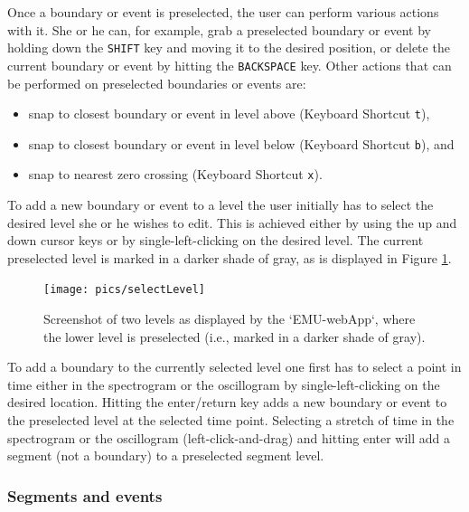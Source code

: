\documentclass[]{book}
\providecommand{\tightlist}{%
  \setlength{\itemsep}{0pt}\setlength{\parskip}{0pt}}
\begin{document}
Once a boundary or event is preselected, the user can perform various actions with it. She or he can, for example, grab a preselected boundary or event by holding down the \texttt{SHIFT} key and moving it to the desired position, or delete the current boundary or event by hitting the \texttt{BACKSPACE} key. Other actions that can be performed on preselected boundaries or events are:

\begin{itemize}
\tightlist
\item
  snap to closest boundary or event in level above (Keyboard Shortcut \texttt{t}),
\item
  snap to closest boundary or event in level below (Keyboard Shortcut \texttt{b}), and
\item
  snap to nearest zero crossing (Keyboard Shortcut \texttt{x}).
\end{itemize}

To add a new boundary or event to a level the user initially has to select the desired level she or he wishes to edit. This is achieved either by using the up and down cursor keys or by single-left-clicking on the desired level. The current preselected level is marked in a darker shade of gray, as is displayed in Figure \ref{fig:webApp-selectLevel}.

\begin{figure}

{\centering \texttt{[image: pics/selectLevel]} 

}

\caption{Screenshot of two levels as displayed by the `EMU-webApp`, where the lower level is preselected (i.e., marked in a darker shade of gray).}\label{fig:webApp-selectLevel}
\end{figure}

To add a boundary to the currently selected level one first has to select a point in time either in the spectrogram or the oscillogram by single-left-clicking on the desired location. Hitting the enter/return key adds a new boundary or event to the preselected level at the selected time point. Selecting a stretch of time in the spectrogram or the oscillogram (left-click-and-drag) and hitting enter will add a segment (not a boundary) to a preselected segment level.

\hypertarget{segments-events}{%
\subsubsection{Segments and events}\label{segments-events}}
\end{document}
